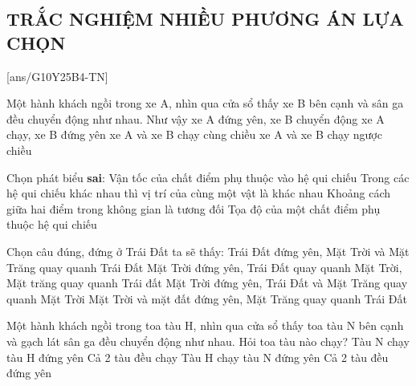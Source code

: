 \subsection{TRẮC NGHIỆM NHIỀU PHƯƠNG ÁN LỰA CHỌN}
\setcounter{ex}{0}
[ans/G10Y25B4-TN]
\begin{ex}
	Một hành khách ngồi trong xe A, nhìn qua cửa sổ thấy xe B bên cạnh và sân ga đều chuyển động như nhau. Như vậy
	\choice
	{xe A đứng yên, xe B chuyển động}
	{\True xe A chạy, xe B đứng yên}
	{xe A và xe B chạy cùng chiều}
	{xe A và xe B chạy ngược chiều}
	\loigiai{
	}
\end{ex}
\begin{ex}
	Chọn phát biểu \textbf{sai}:
	\choice
	{Vận tốc của chất điểm phụ thuộc vào hệ qui chiếu}
	{Trong các hệ qui chiếu khác nhau thì vị trí của cùng một vật là khác nhau}
	{\True Khoảng cách giữa hai điểm trong không gian là tương đối}
	{Tọa độ của một chất điểm phụ thuộc hệ qui chiếu}
\end{ex}
\begin{ex}
	Chọn câu đúng, đứng ở Trái Đất ta sẽ thấy:
	\choice
	{\True Trái Đất đứng yên, Mặt Trời và Mặt Trăng quay quanh Trái Đất}
	{Mặt Trời đứng yên, Trái Đất quay quanh Mặt Trời, Mặt trăng quay quanh Trái đất}
	{Mặt Trời đứng yên, Trái Đất và Mặt Trăng quay quanh Mặt Trời}
	{Mặt Trời và mặt đất đứng yên, Mặt Trăng quay quanh Trái Đất}
	\loigiai{
	}
\end{ex}
\begin{ex}
	Một hành khách ngồi trong toa tàu H, nhìn qua cửa sổ thấy toa tàu N bên cạnh và gạch lát sân ga đều chuyển động như nhau. Hỏi toa tàu nào chạy?
	\choice
	{Tàu N chạy tàu H đứng yên}
	{Cả 2 tàu đều chạy}
	{\True Tàu H chạy tàu N đứng yên}
	{Cả 2 tàu đều đứng yên}
	\loigiai{
	}
\end{ex}

